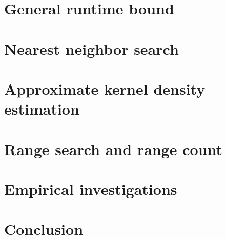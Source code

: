 \documentclass[twoside,11pt]{article} %
\begin{document}


\section{General runtime bound}
\label{sec:bound}



\section{Nearest neighbor search}
\label{sec:nns}



\section{Approximate kernel density estimation}
\label{sec:akde}



\section{Range search and range count}
\label{sec:rs}




%

\section{Empirical investigations}
\label{sec:emp}



\section{Conclusion}



%


\appendix

\end{document}
